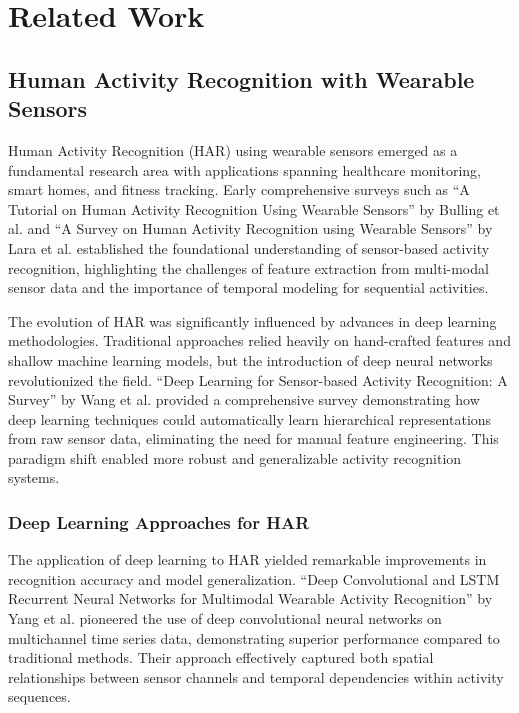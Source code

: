 \chapter{Related Work}

\section{Human Activity Recognition with Wearable Sensors}

\hspace{2em}Human Activity Recognition (HAR) using wearable sensors emerged as a fundamental research area with applications spanning healthcare monitoring, smart homes, and fitness tracking. Early comprehensive surveys such as ``A Tutorial on Human Activity Recognition Using Wearable Sensors'' by Bulling et al. \cite{Bulling2014HARSurvey} and ``A Survey on Human Activity Recognition using Wearable Sensors'' by Lara et al. \cite{Lara2013Mobile} established the foundational understanding of sensor-based activity recognition, highlighting the challenges of feature extraction from multi-modal sensor data and the importance of temporal modeling for sequential activities.

The evolution of HAR was significantly influenced by advances in deep learning methodologies. Traditional approaches relied heavily on hand-crafted features and shallow machine learning models, but the introduction of deep neural networks revolutionized the field. ``Deep Learning for Sensor-based Activity Recognition: A Survey'' by Wang et al. \cite{Wang2019DeepHAR} provided a comprehensive survey demonstrating how deep learning techniques could automatically learn hierarchical representations from raw sensor data, eliminating the need for manual feature engineering. This paradigm shift enabled more robust and generalizable activity recognition systems.

\subsection{Deep Learning Approaches for HAR}

\hspace{2em}The application of deep learning to HAR yielded remarkable improvements in recognition accuracy and model generalization. ``Deep Convolutional and LSTM Recurrent Neural Networks for Multimodal Wearable Activity Recognition'' by Yang et al. \cite{Yang2015DeepConvLSTM} pioneered the use of deep convolutional neural networks on multichannel time series data, demonstrating superior performance compared to traditional methods. Their approach effectively captured both spatial relationships between sensor channels and temporal dependencies within activity sequences.

